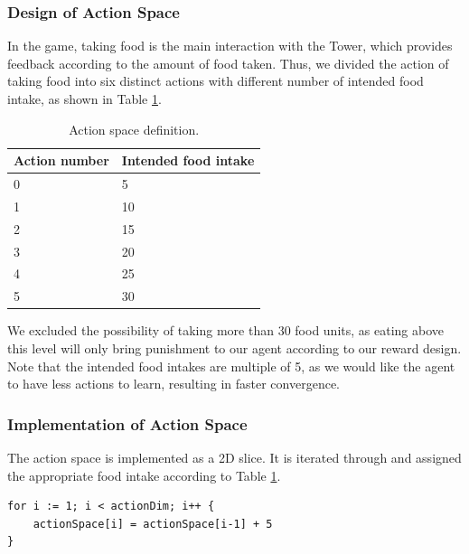 \subsubsection{Design of Action Space}
In the game, taking food is the main interaction with the Tower, which provides feedback according to the amount of food taken. Thus, we divided the action of taking food into six distinct actions with different number of intended food intake, as shown in Table \ref{action-space}.
\begin{table}
\centering
\caption{Action space definition.}
\begin{tabular}{@{}ll@{}}
\toprule
Action number & Intended food intake \\ \midrule
0             & 5                    \\
1             & 10                   \\
2             & 15                   \\
3             & 20                   \\
4             & 25                   \\
5             & 30                   \\ \bottomrule
\end{tabular}
\label{action-space}
\end{table}

We excluded the possibility of taking more than 30 food units, as eating above this level will only bring punishment to our agent according to our reward design. Note that the intended food intakes are multiple of 5, as we would like the agent to have less actions to learn, resulting in faster convergence. 
\subsubsection{Implementation of Action Space}
The action space is implemented as a 2D slice. It is iterated through and assigned the appropriate food intake according to Table \ref{action-space}.
\begin{lstlisting}
for i := 1; i < actionDim; i++ {
	actionSpace[i] = actionSpace[i-1] + 5
}
\end{lstlisting} 
